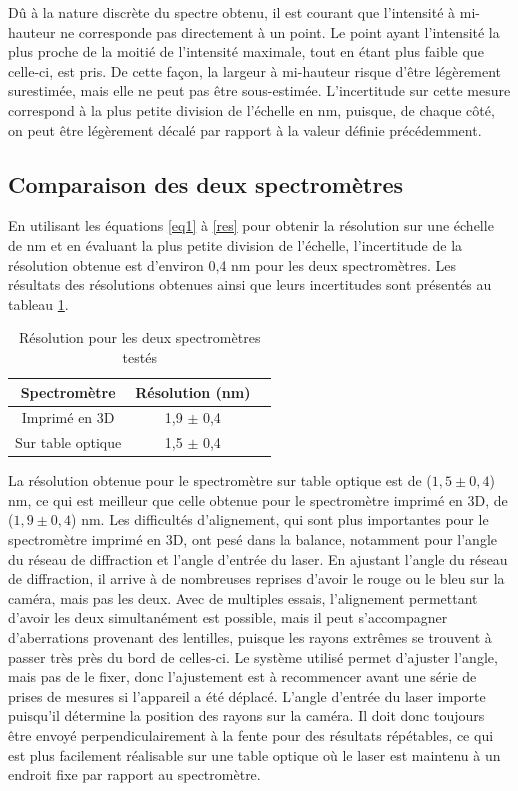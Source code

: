 \documentclass[11pt,letterpaper]{article}
\begin{document}
Dû à la nature discrète du spectre obtenu, il est courant que l'intensité à 
mi-hauteur ne corresponde pas directement à un point. Le point ayant l'intensité la plus proche
de la moitié de l'intensité maximale, tout en étant plus faible que celle-ci, est pris. De
cette façon, la largeur à mi-hauteur risque d'être légèrement surestimée, mais elle ne peut pas
être sous-estimée. L'incertitude sur cette mesure correspond à la plus petite division de l'échelle en nm,
puisque, de chaque côté, on peut être légèrement décalé par rapport à la valeur définie précédemment.

\subsection{Comparaison des deux spectromètres}

En utilisant les équations \ref{eq1} à \ref{res} pour obtenir la résolution sur une échelle de nm et en évaluant la plus petite division de l'échelle,
l'incertitude de la résolution obtenue est d'environ 0,4 nm pour les deux spectromètres. Les résultats 
des résolutions obtenues ainsi que leurs incertitudes sont présentés au tableau \ref{res_tab}.

\begin{table}[H]
  \centering
  \caption{Résolution pour les deux spectromètres testés}
  \begin{tabular}{|c|c|c|}\hline
    Spectromètre & Résolution (nm) \\
    \hline
    Imprimé en 3D & 1,9 $\pm$ 0,4\\    \hline
    Sur table optique & 1,5 $\pm$ 0,4\\    \hline
  \end{tabular}
  \label{res_tab}
\end{table}

La résolution obtenue pour le spectromètre sur table optique est de ($1,5 \pm 0,4$) nm, ce qui
est meilleur que celle obtenue pour le spectromètre imprimé en 3D, de ($1,9 \pm 0,4$) nm. Les difficultés d'alignement, qui sont plus importantes pour le spectromètre imprimé en 3D, ont
pesé dans la balance, notamment pour l'angle du réseau de diffraction et l'angle d'entrée du laser. 
En ajustant l'angle du réseau de diffraction, il arrive à de nombreuses reprises d'avoir 
le rouge ou le bleu sur la caméra, mais pas les deux.
Avec de multiples essais, l'alignement permettant d'avoir les deux simultanément est possible,
mais il peut s'accompagner d'aberrations provenant des lentilles, puisque les rayons extrêmes
se trouvent à passer très près du bord de celles-ci. Le système utilisé permet d'ajuster l'angle,
mais pas de le fixer, donc l'ajustement est à recommencer avant une série de prises de mesures si
l'appareil a été déplacé. 
L'angle d'entrée du laser importe puisqu'il détermine la position des rayons sur la caméra. Il doit
donc toujours être envoyé perpendiculairement à la fente pour des résultats répétables, ce qui est
plus facilement réalisable sur une table optique où le laser est maintenu à un endroit fixe par 
rapport au spectromètre.  
\end{document}

